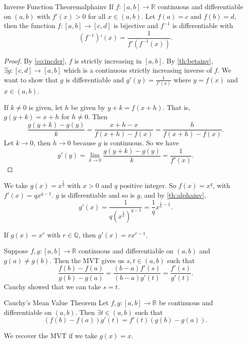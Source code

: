 \begin{theorem}{Inverse Function Theorem}{alphainv}
    If \(f:[a,b]\to\mathbb{R}\) continuous and differentiable on \((a,b)\) with \(f'(x) >0\) for all \(x \in (a,b)\). Let \(f(a) = c\) and \(f(b) = d\), then the function \(f:[a,b]\to[c,d]\) is bijective and \(f^{-1}\) is differentiable with
    \[
        (f^{-1})'(x) = \frac{1}{f'(f^{-1}(x))}.
    \]
\end{theorem}
\begin{proof}
    By \cref{co:incder}, \(f\) is strictly increasing in \([a,b]\). By \cref{th:betainv}, \(\exists g: [c,d] \to [a,b]\) which is a continuous strictly increasing inverse of \(f\). We want to show that \(g\) is differentiable and \(g'(y) = \frac{1}{f'(x)}\) where \(y = f(x)\) and \(x \in (a,b)\).

    If \(k \neq 0\) is given, let \(h\) be given by \(y + k = f(x + h)\). That is, \(g(y + k) = x + h\) for \(h \neq 0\). Then
    \[
        \frac{g(y + k) - g(y)}{k} = \frac{x + h - x}{f(x + h) - f(x)} = \frac{h}{f(x + h) - f(x)}.
    \]
    Let \(k \to 0\), then \(h \to 0\) because \(g\) is continuous. So we have
    \[
        g'(y) = \lim\limits_{k \to 0} \frac{g(y + k) - g(y)}{k} = \frac{1}{f'(x)}.
    \]
\end{proof}
\begin{example}
    We take \(g(x) = x^\frac{1}{q}\) with \(x > 0\) and \(q\) positive integer. So \(f(x) = x^q\), with \(f'(x) = qx^{q-1}\). \(g\) is differentiable and so is \(g\), and by \cref{th:alphainv},
    \[
        g'(x) = \frac{1}{q(x^\frac{1}{q})^{q-1}} = \frac{1}{q}x^{\frac{1}{q} - 1}.
    \]
\end{example}
\begin{remark}
    If \(g(x) = x^r\) with \(r \in \mathbb{Q}\), then \(g'(x) = rx^{r-1}\).
\end{remark}
Suppose \(f,g: [a,b] \to \mathbb{R}\) continuous and differentiable on \((a,b)\) and \(g(a) \neq g(b)\). Then the MVT gives us \(s,t \in (a,b)\) such that
\[
    \frac{f(b) - f(a)}{g(b) - g(a)} = \frac{(b-a)f'(s)}{(b-a)g'(t)}=\frac{f'(s)}{g'(t)}.
\]
Cauchy showed that we can take \(s = t\).
\begin{theorem}{Cauchy's Mean Value Theorem}{}
    Let \(f,g: [a,b] \to \mathbb{R}\) be continuous and differentiable on \((a,b)\). Then \(\exists t \in (a,b)\) such that
    \[
        (f(b) - f(a))g'(t) = f'(t)(g(b) - g(a)).
    \]
\end{theorem}
\begin{remark}
    We recover the MVT if we take \(g(x) = x\).
\end{remark}